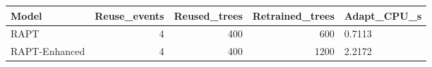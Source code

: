 \begin{tabular}{lrrrl}
\toprule
Model & Reuse_events & Reused_trees & Retrained_trees & Adapt_CPU_s \\
\midrule
RAPT & 4 & 400 & 600 & 0.7113 \\
RAPT-Enhanced & 4 & 400 & 1200 & 2.2172 \\
\bottomrule
\end{tabular}
